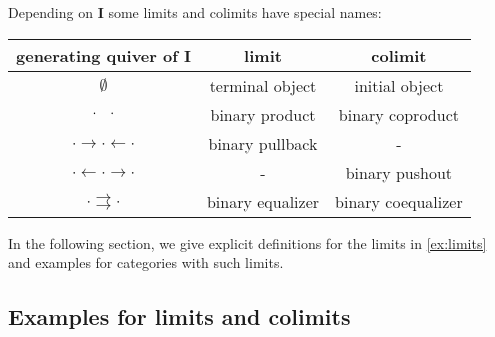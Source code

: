 \begin{example}\label{ex:limits}
Depending on \textbf{I} some limits and colimits have special names:
\begin{center}
\begin{tabular}{c|c|c}
generating quiver of $\mathbf{I}$ & limit & colimit \\
\hline
$\emptyset$ & terminal object & initial object \\
$\cdot \text{\phantom{$\rightarrow$}} \cdot$ & binary product & binary coproduct \\
$\cdot \rightarrow \cdot \leftarrow \cdot$ & binary pullback & - \\
$\cdot \leftarrow \cdot \rightarrow \cdot$  & - & binary pushout \\
$ \cdot \rightrightarrows \cdot$ & binary equalizer & binary coequalizer
\end{tabular}
\end{center}
\end{example}

In the following section, we give explicit definitions for the limits in \ref{ex:limits} and examples for categories with such limits.

\subsection{Examples for limits and colimits}

